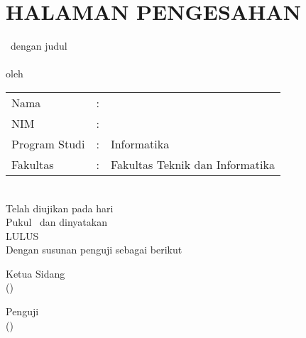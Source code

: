 \chapter*{HALAMAN PENGESAHAN}
\onehalfspacing
\begin{center}
   \type \, dengan judul \\[0.3cm]
    
    \bo{\Judul}  \\[0.6cm]
    oleh \\[0.3cm]
\noindent
\begin{tabular}{l l p{6cm}}
	Nama&: & \penulis \\
	NIM&: & \nim \\
	Program Studi&: & Informatika \\
	Fakultas &: & Fakultas Teknik dan Informatika \\
\end{tabular} \\
\vspace{0.5em}
Telah diujikan pada hari \hariTanggalSidang \\
Pukul \waktuSidang \ dan dinyatakan \\
LULUS \\
Dengan susunan penguji sebagai berikut \\
\end{center}
\vspace*{0.3cm}
\noindent
\begin{minipage}{.5\textwidth}
\begin{center}
  Ketua Sidang \\[1.2cm]
(\ketuaSidang) \\
\ketuaSidangNIDN
\end{center}
\end{minipage}%
\begin{minipage}{.5\textwidth}
\begin{center}
  Penguji \\[1.2cm]
  
  (\penguji) \\
  \pengujiNIDN
    
\end{center}
\end{minipage}
\vspace*{0.1cm}
